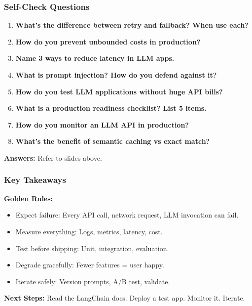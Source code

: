\documentclass[aspectratio=169,11pt]{beamer}
\begin{document}
\begin{frame}
\frametitle{Self-Check Questions}

\small
\begin{enumerate}
  \setlength{\itemsep}{2pt}
  \item \textbf{What's the difference between retry and fallback? When use each?}
  \item \textbf{How do you prevent unbounded costs in production?}
  \item \textbf{Name 3 ways to reduce latency in LLM apps.}
  \item \textbf{What is prompt injection? How do you defend against it?}
  \item \textbf{How do you test LLM applications without huge API bills?}
  \item \textbf{What is a production readiness checklist? List 5 items.}
  \item \textbf{How do you monitor an LLM API in production?}
  \item \textbf{What's the benefit of semantic caching vs exact match?}
\end{enumerate}

\vspace{1em}

\textbf{Answers:} Refer to slides above.

\end{frame}

\begin{frame}
\frametitle{Key Takeaways}

\small
\textbf{Golden Rules:}
\begin{itemize}
  \setlength{\itemsep}{0pt}
  \item Expect failure: Every API call, network request, LLM invocation can fail.
  \item Measure everything: Logs, metrics, latency, cost.
  \item Test before shipping: Unit, integration, evaluation.
  \item Degrade gracefully: Fewer features = user happy.
  \item Iterate safely: Version prompts, A/B test, validate.
\end{itemize}

\vspace{1em}

\textbf{Next Steps:}
Read the LangChain docs. Deploy a test app. Monitor it. Iterate.

\end{frame}
\end{document}
